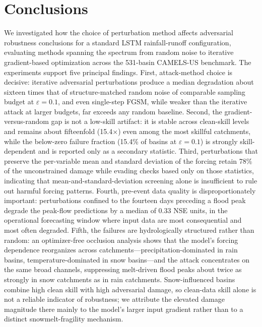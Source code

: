 \documentclass[final]{agujournal2019}
\begin{document}
\section{Conclusions}

We investigated how the choice of perturbation method affects adversarial robustness conclusions for a standard LSTM rainfall-runoff configuration, evaluating methods spanning the spectrum from random noise to iterative gradient-based optimization across the 531-basin CAMELS-US benchmark. The experiments support five principal findings. First, attack-method choice is decisive: iterative adversarial perturbations produce a median degradation about sixteen times that of structure-matched random noise of comparable sampling budget at $\varepsilon = 0.1$, and even single-step FGSM, while weaker than the iterative attack at larger budgets, far exceeds any random baseline. Second, the gradient-versus-random gap is not a low-skill artifact: it is stable across clean-skill levels and remains about fifteenfold (15.4$\times$) even among the most skillful catchments, while the below-zero failure fraction (15.4\% of basins at $\varepsilon = 0.1$) is strongly skill-dependent and is reported only as a secondary statistic. Third, perturbations that preserve the per-variable mean and standard deviation of the forcing retain 78\% of the unconstrained damage while evading checks based only on those statistics, indicating that mean-and-standard-deviation screening alone is insufficient to rule out harmful forcing patterns. Fourth, pre-event data quality is disproportionately important: perturbations confined to the fourteen days preceding a flood peak degrade the peak-flow predictions by a median of 0.33 NSE units, in the operational forecasting window where input data are most consequential and most often degraded. Fifth, the failures are hydrologically structured rather than random: an optimizer-free occlusion analysis shows that the model's forcing dependence reorganizes across catchments---precipitation-dominated in rain basins, temperature-dominated in snow basins---and the attack concentrates on the same broad channels, suppressing melt-driven flood peaks about twice as strongly in snow catchments as in rain catchments. Snow-influenced basins combine high clean skill with high adversarial damage, so clean-data skill alone is not a reliable indicator of robustness; we attribute the elevated damage magnitude there mainly to the model's larger input gradient rather than to a distinct snowmelt-fragility mechanism.
\end{document}

